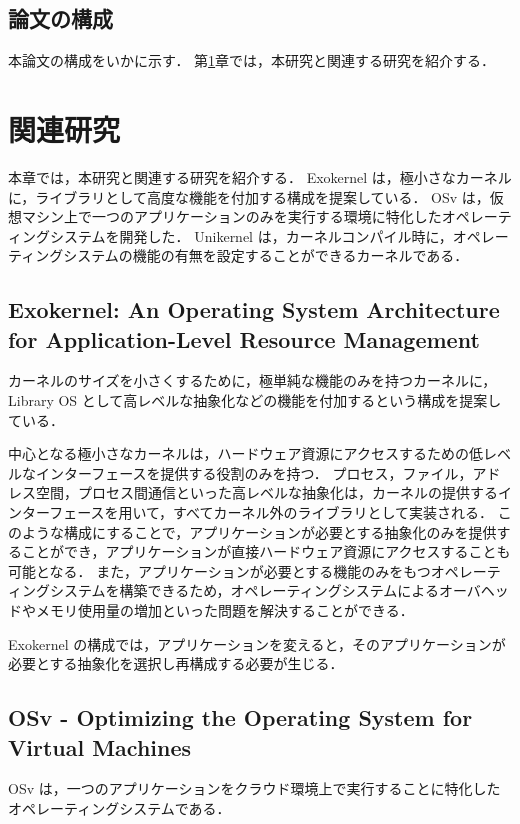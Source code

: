 \documentclass[graduation-thesis]{mlarticle}
\begin{document}
\subsection {論文の構成}
\label{intro:arch}
本論文の構成をいかに示す．
第\ref{relative}章では，本研究と関連する研究を紹介する．

\section {関連研究}
\label{relative}



本章では，本研究と関連する研究を紹介する．
Exokernel は，極小さなカーネルに，ライブラリとして高度な機能を付加する構成を提案している．
OSv は，仮想マシン上で一つのアプリケーションのみを実行する環境に特化したオペレーティングシステムを開発した．
Unikernel は，カーネルコンパイル時に，オペレーティングシステムの機能の有無を設定することができるカーネルである．

\subsection {Exokernel: An Operating System Architecture for Application-Level Resource Management}
\label{relarive:exokernel}
カーネルのサイズを小さくするために，極単純な機能のみを持つカーネルに，Library OS として高レベルな抽象化などの機能を付加するという構成を提案している．

中心となる極小さなカーネルは，ハードウェア資源にアクセスするための低レベルなインターフェースを提供する役割のみを持つ．
プロセス，ファイル，アドレス空間，プロセス間通信といった高レベルな抽象化は，カーネルの提供するインターフェースを用いて，すべてカーネル外のライブラリとして実装される．
このような構成にすることで，アプリケーションが必要とする抽象化のみを提供することができ，アプリケーションが直接ハードウェア資源にアクセスすることも可能となる．
また，アプリケーションが必要とする機能のみをもつオペレーティングシステムを構築できるため，オペレーティングシステムによるオーバヘッドやメモリ使用量の増加といった問題を解決することができる．


Exokernel の構成では，アプリケーションを変えると，そのアプリケーションが必要とする抽象化を選択し再構成する必要が生じる．

\subsection {OSv - Optimizing the Operating System for Virtual Machines}
\label{relative:unikernel}
OSv は，一つのアプリケーションをクラウド環境上で実行することに特化したオペレーティングシステムである．
\end{document}
